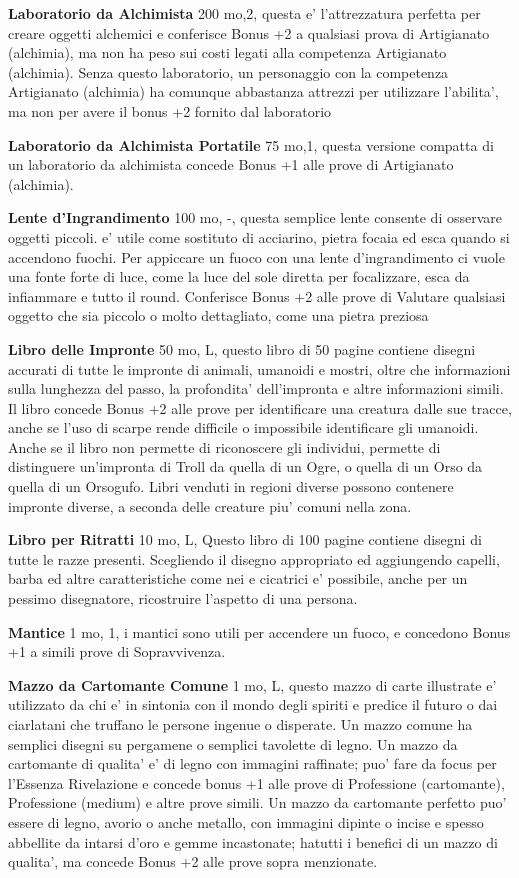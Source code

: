 \documentclass[a4paper,11pt,twoside,openany]{book}
\begin{document}
{\textbf{Laboratorio da Alchimista} 200 mo,2,  questa e' l'attrezzatura perfetta per creare oggetti alchemici e conferisce Bonus +2 a qualsiasi prova di Artigianato (alchimia), ma non ha peso sui costi legati alla competenza Artigianato (alchimia). 
Senza questo laboratorio, un personaggio con la competenza Artigianato (alchimia) ha comunque abbastanza attrezzi per utilizzare l'abilita', ma non per avere il bonus +2 fornito dal laboratorio

\textbf{Laboratorio da Alchimista Portatile} 75 mo,1, questa versione compatta di un laboratorio da alchimista concede Bonus +1 alle prove di Artigianato (alchimia).

\textbf{Lente d'Ingrandimento} 100 mo, -, questa semplice lente consente di osservare oggetti piccoli. e' utile come sostituto di acciarino, pietra focaia ed esca quando si accendono fuochi. 
Per appiccare un fuoco con una lente d'ingrandimento ci vuole una fonte forte di luce, come la luce del sole diretta per focalizzare, esca da infiammare e tutto il round. Conferisce Bonus +2 alle prove di Valutare qualsiasi oggetto che sia piccolo o molto dettagliato, come una pietra preziosa 

\textbf{Libro delle Impronte} 50 mo, L,  questo libro di 50 pagine contiene disegni accurati di tutte le impronte di animali, umanoidi e mostri, oltre che informazioni sulla lunghezza del passo, la profondita' dell'impronta e altre informazioni simili. Il libro concede Bonus +2 alle prove per identificare una creatura dalle sue tracce, anche se l'uso di scarpe rende difficile o impossibile identificare gli umanoidi. 
Anche se il libro non permette di riconoscere gli individui, permette di distinguere un'impronta di Troll da quella di un Ogre, o quella di un Orso da quella di un Orsogufo. Libri venduti in regioni diverse possono contenere impronte diverse, a seconda delle creature piu' comuni nella zona.

\textbf{Libro per Ritratti} 10 mo, L,  Questo libro di 100 pagine contiene disegni di tutte le razze presenti. Scegliendo il disegno appropriato ed aggiungendo capelli, barba ed altre caratteristiche come nei e cicatrici e' possibile, anche per un pessimo disegnatore, ricostruire l'aspetto di una persona.

\textbf{Mantice} 1 mo, 1, i mantici sono utili per accendere un fuoco, e concedono Bonus +1 a simili prove di Sopravvivenza.

\textbf{Mazzo da Cartomante Comune} 1 mo, L, questo mazzo di carte illustrate e' utilizzato da chi e' in sintonia con il mondo degli spiriti e predice il futuro o dai ciarlatani che truffano le persone ingenue o disperate. Un mazzo comune ha semplici disegni su pergamene o semplici tavolette di legno. 
Un mazzo da cartomante di qualita' e' di legno con immagini raffinate; puo' fare da focus per l'Essenza Rivelazione e concede bonus +1 alle prove di Professione (cartomante), Professione (medium) e altre prove simili. 
Un mazzo da cartomante perfetto puo' essere di legno, avorio o anche metallo, con immagini dipinte o incise e spesso abbellite da intarsi d'oro e gemme incastonate; hatutti i benefici di un mazzo di qualita', ma concede Bonus +2 alle prove sopra menzionate.

}
\end{document}
